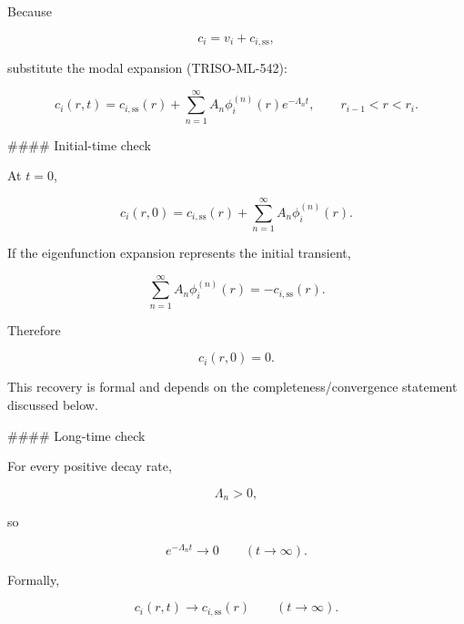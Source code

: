 \documentclass[11pt,a4paper]{article}
\begin{document}
Because

\begin{equation}
c_i=v_i+c_{i,\mathrm{ss}},
\tag{TRISO-ML-553}
\label{eq:triso-ml-553}
\end{equation}

substitute the modal expansion (TRISO-ML-542):

\begin{equation}
\boxed{
c_i(r,t)
=
c_{i,\mathrm{ss}}(r)
+
\sum_{n=1}^{\infty}
A_n
\phi_i^{(n)}(r)
e^{-\Lambda_nt},
\qquad
r_{i-1}<r<r_i.
}
\tag{TRISO-ML-554}
\label{eq:triso-ml-554}
\end{equation}

\#\#\#\# Initial-time check

At $t=0$,

\begin{equation}
c_i(r,0)
=
c_{i,\mathrm{ss}}(r)
+
\sum_{n=1}^{\infty}
A_n\phi_i^{(n)}(r).
\tag{TRISO-ML-555}
\label{eq:triso-ml-555}
\end{equation}

If the eigenfunction expansion represents the initial transient,

\begin{equation}
\sum_{n=1}^{\infty}
A_n\phi_i^{(n)}(r)
=
-c_{i,\mathrm{ss}}(r).
\tag{TRISO-ML-556}
\label{eq:triso-ml-556}
\end{equation}

Therefore

\begin{equation}
c_i(r,0)=0.
\tag{TRISO-ML-557}
\label{eq:triso-ml-557}
\end{equation}

This recovery is formal and depends on the completeness/convergence statement discussed below.

\#\#\#\# Long-time check

For every positive decay rate,

\begin{equation}
\Lambda_n>0,
\tag{TRISO-ML-558}
\label{eq:triso-ml-558}
\end{equation}

so

\begin{equation}
e^{-\Lambda_nt}\to0
\qquad
(t\to\infty).
\tag{TRISO-ML-559}
\label{eq:triso-ml-559}
\end{equation}

Formally,

\begin{equation}
\boxed{
c_i(r,t)\to c_{i,\mathrm{ss}}(r)
\qquad
(t\to\infty).
}
\tag{TRISO-ML-560}
\label{eq:triso-ml-560}
\end{equation}
\end{document}
